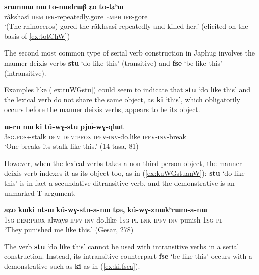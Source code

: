 \documentclass[oneside,a4paper,11pt]{article}
\newcommand{\ipa}[1]{\textbf{\phon#1}} %
\newcommand{\jpg}[2]{\ipa{#1} `#2'} %
\begin{document}
\begin{exe}
\ex \label{ex:totChW2}
\gll 	\ipa{srɯnmɯ} 	\ipa{nɯ} 	\ipa{to-nɯdrɯβ} 	\ipa{ʑo} 	 	\ipa{to-tɕʰɯ} \\
 râkshasî \textsc{dem}  \textsc{ifr}-repeatedly.gore  \textsc{emph}  \textsc{ifr}-gore \\
 \glt `(The rhinoceros) gored the râkhsasî repeatedly and killed her.' (elicited on the basis of \ref{ex:totChW})
\end{exe}	

The second most common type of serial verb construction in Japhug involves the manner deixis verbs \jpg{stu}{do like this} (transitive) and \jpg{fse}{be like this} (intransitive). 

Examples like (\ref{ex:tuWGstu}) could seem to indicate that \jpg{stu}{do like this} and the lexical verb do not share the same object, as  \jpg{ki}{this}, which obligatorily occurs before the manner deixis verbs, appears to be its object. 

\begin{exe}
\ex \label{ex:tuWGstu}
\gll 	
\ipa{ɯ-ru} 	\ipa{nɯ} 	\ipa{ki} 	\ipa{tú-wɣ-stu} 	\ipa{pjɯ́-wɣ-qlɯt} \\
\textsc{3sg.poss}-stalk \textsc{dem} \textsc{dem:prox} \textsc{ipfv-inv}-do.like \textsc{ipfv-inv}-break \\
\glt `One breaks its stalk like this.' (14-tasa, 81)
\end{exe}	

However, when the lexical verbs takes a non-third person object, the manner deixis verb indexes it as its object too, as in (\ref{ex:kuWGstuanW}): \jpg{stu}{do like this} is in fact a secundative ditransitive verb, and the demonstrative is an unmarked T argument.

\begin{exe}
\ex \label{ex:kuWGstuanW}
\gll 	
 \ipa{aʑo} 	\ipa{kɯki} 	\ipa{ntsɯ} 	\ipa{kú-wɣ-stu-a-nɯ} 	\ipa{tɕe,} 	\ipa{kú-wɣ-znɯkʰrɯm-a-nɯ} \\
 \textsc{1sg} \textsc{dem:prox} always \textsc{ipfv-inv}-do.like-\textsc{1sg-pl} \textsc{lnk} \textsc{ipfv-inv}-punish-\textsc{1sg-pl} \\
 \glt `They punished me like this.' (Gesar, 278)
\end{exe}	

The verb \jpg{stu}{do like this} cannot be used with intransitive verbs in a serial construction. Instead, its intransitive counterpart \jpg{fse}{be like this} occurs with a demonstrative such as \ipa{ki} as in (\ref{ex:ki.fsea}).
\end{document}
